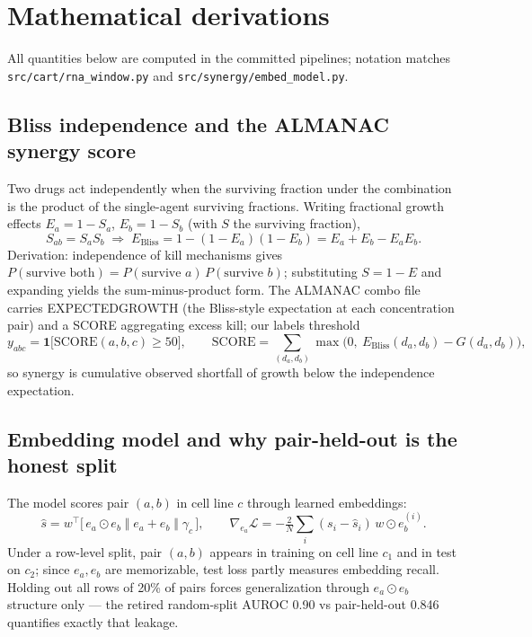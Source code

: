 \section{Mathematical derivations}
All quantities below are computed in the committed pipelines; notation matches
\texttt{src/cart/rna\_window.py} and \texttt{src/synergy/embed\_model.py}.

\subsection{Bliss independence and the ALMANAC synergy score}
Two drugs act independently when the surviving fraction under the combination
is the product of the single-agent surviving fractions. Writing fractional
growth effects $E_a=1-S_a$, $E_b=1-S_b$ (with $S$ the surviving fraction),
\begin{equation}
S_{ab}=S_aS_b \;\Longrightarrow\; E_{\mathrm{Bliss}} = 1-(1-E_a)(1-E_b)=E_a+E_b-E_aE_b .
\end{equation}
Derivation: independence of kill mechanisms gives $P(\text{survive both})=P(\text{survive }a)\,P(\text{survive }b)$; substituting $S=1-E$ and expanding yields the sum-minus-product form. The ALMANAC combo file carries
EXPECTEDGROWTH (the Bliss-style expectation at each concentration pair) and a
SCORE aggregating excess kill; our labels threshold
\begin{equation}
y_{abc}=\mathbf 1\big[\mathrm{SCORE}(a,b,c)\ge 50\big],\qquad
\mathrm{SCORE}=\textstyle\sum_{(d_a,d_b)}\max\big(0,\ E_{\mathrm{Bliss}}(d_a,d_b)-G(d_a,d_b)\big),
\end{equation}
so synergy is cumulative observed shortfall of growth below the independence expectation.

\subsection{Embedding model and why pair-held-out is the honest split}
The model scores pair $(a,b)$ in cell line $c$ through learned embeddings:
\begin{equation}
\hat s = w^\top\big[\,e_a\odot e_b \;\Vert\; e_a+e_b \;\Vert\; \gamma_c\,\big],\qquad
\nabla_{e_a}\mathcal L = -\tfrac{2}{N}\textstyle\sum_i (s_i-\hat s_i)\,w\odot e_b^{(i)} .
\end{equation}
Under a row-level split, pair $(a,b)$ appears in training on cell line $c_1$
and in test on $c_2$; since $e_a,e_b$ are memorizable, test loss partly
measures embedding recall. Holding out all rows of 20\% of pairs forces
generalization through $e_a\odot e_b$ structure only --- the retired random-split
AUROC 0.90 vs pair-held-out 0.846 quantifies exactly that leakage.

